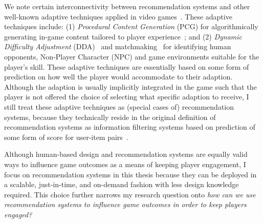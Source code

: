 We note certain interconnectivity between recommendation systems and other well-known adaptive techniques applied in video games~\cite{bakkes2012personalised,chen2015analytics}. These adaptive techniques include: (1) \textit{Procedural Content Generation} (PCG) for algorithmically generating in-game content tailored to player experience~\cite{yannakakis2011experience,togelius2011search}; and (2) \textit{Dynamic Difficulty Adjustment} (DDA)~\cite{hunicke2005case} and matchmaking~\cite{Delalleau2012,herbrich:trueskill} for identifying human opponents, Non-Player Character (NPC) and game environments suitable for the player's skill. These adaptive techniques are essentially based on some form of prediction on how well the player would accommodate to their adaption. Although the adaption is usually implicitly integrated in the game such that the player is not offered the choice of selecting what specific adaption to receive, I still treat these adaptive techniques as (special cases of) recommendation systems, because they technically reside in the original definition of recommendation systems as information filtering systems based on prediction of some form of score for user-item pairs~\cite{isinkaye2015recommendation,bobadilla2013recommender,resnick1997recommender,adomavicius2005toward}.


Although human-based design and recommendation systems are equally valid ways to influence game outcomes as a means of keeping player engagement, I focus on recommendation systems in this thesis because they can be deployed in a scalable, just-in-time, and on-demand fashion with less design knowledge required. This choice further narrows my research question onto \textit{how can we use recommendation systems to influence game outcomes in order to keep players engaged?}

